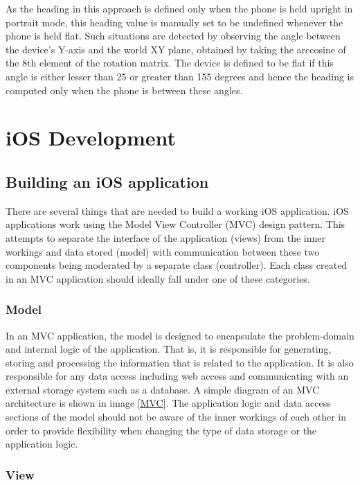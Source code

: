 \documentclass[12pt,a4paper]{report}
\begin{document}
As the heading in this approach is defined only when the phone is held upright in portrait mode, this heading value is manually set to be undefined whenever the phone is held flat. Such situations are detected by observing the angle between the device's Y-axis and the world XY plane, obtained by taking the arccosine of the 8th element of the rotation matrix. The device is defined to be flat if this angle is either lesser than 25 or greater than 155 degrees and hence the heading is computed only when the phone is between these angles.

\section{iOS Development}


\subsection{Building an iOS application}

There are several things that are needed to build a working iOS application. iOS applications work using the Model View Controller (MVC) design pattern. This attempts to separate the interface of the application (views) from the inner workings and data stored (model) with communication between these two components being moderated by a separate class (controller). Each class created in an MVC application should ideally fall under one of these categories. 

\subsubsection{Model}

In an MVC application, the model is designed to encapsulate the problem-domain and internal logic of the application. That is, it is responsible for generating, storing and processing the information that is related to the application. It is also responsible for any data access including web access and communicating with an external storage system such as a database. A simple diagram of an MVC architecture is shown in image \ref{MVC}. The application logic and data access sections of the model should not be aware of the inner workings of each other in order to provide flexibility when changing the type of data storage or the application logic. 

\subsubsection{View}
\end{document}
